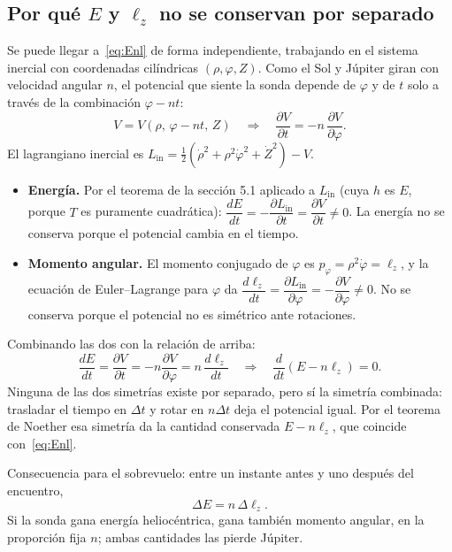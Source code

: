 \documentclass[12pt,letterpaper]{article}
\begin{document}
\subsection{Por qué $E$ y $\ell_z$ no se conservan por separado}

Se puede llegar a~\eqref{eq:Enl} de forma independiente, trabajando en el sistema inercial con
coordenadas cilíndricas $(\rho,\varphi,Z)$. Como el Sol y Júpiter giran con velocidad angular
$n$, el potencial que siente la sonda depende de $\varphi$ y de $t$ solo a través de la
combinación $\varphi - nt$:
\[
V = V(\rho,\, \varphi - nt,\, Z)
\quad\Longrightarrow\quad
\frac{\partial V}{\partial t} = -n\,\frac{\partial V}{\partial\varphi}.
\]
El lagrangiano inercial es $L_{\mathrm{in}} = \tfrac12(\dot\rho^2 + \rho^2\dot\varphi^2 + \dot Z^2) - V$.
\begin{itemize}
\item \textbf{Energía.} Por el teorema de la sección 5.1 aplicado a $L_{\mathrm{in}}$ (cuya $h$
es $E$, porque $T$ es puramente cuadrática):
$\dfrac{dE}{dt} = -\dfrac{\partial L_{\mathrm{in}}}{\partial t} = \dfrac{\partial V}{\partial t} \neq 0$.
La energía no se conserva porque el potencial cambia en el tiempo.
\item \textbf{Momento angular.} El momento conjugado de $\varphi$ es
$p_\varphi = \rho^2\dot\varphi = \ell_z$, y la ecuación de Euler--Lagrange para $\varphi$ da
$\dfrac{d\ell_z}{dt} = \dfrac{\partial L_{\mathrm{in}}}{\partial\varphi} = -\dfrac{\partial V}{\partial \varphi} \neq 0$.
No se conserva porque el potencial no es simétrico ante rotaciones.
\end{itemize}
Combinando las dos con la relación de arriba:
\[
\frac{dE}{dt} = \frac{\partial V}{\partial t} = -n\frac{\partial V}{\partial\varphi} = n\,\frac{d\ell_z}{dt}
\quad\Longrightarrow\quad
\frac{d}{dt}\left(E - n\ell_z\right) = 0 .
\]
Ninguna de las dos simetrías existe por separado, pero sí la simetría combinada: trasladar el
tiempo en $\Delta t$ y rotar en $n\Delta t$ deja el potencial igual. Por el teorema de Noether
esa simetría da la cantidad conservada $E - n\ell_z$, que coincide con~\eqref{eq:Enl}.

Consecuencia para el sobrevuelo: entre un instante antes y uno después del encuentro,
\begin{equation}
\Delta E = n\,\Delta \ell_z .
\label{eq:DeltaE}
\end{equation}
Si la sonda gana energía heliocéntrica, gana también momento angular, en la proporción fija
$n$; ambas cantidades las pierde Júpiter.
\end{document}
